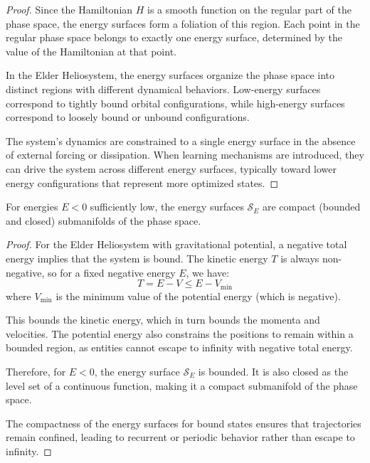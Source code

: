 \begin{proof}
Since the Hamiltonian $H$ is a smooth function on the regular part of the phase space, the energy surfaces form a foliation of this region. Each point in the regular phase space belongs to exactly one energy surface, determined by the value of the Hamiltonian at that point.

In the Elder Heliosystem, the energy surfaces organize the phase space into distinct regions with different dynamical behaviors. Low-energy surfaces correspond to tightly bound orbital configurations, while high-energy surfaces correspond to loosely bound or unbound configurations.

The system's dynamics are constrained to a single energy surface in the absence of external forcing or dissipation. When learning mechanisms are introduced, they can drive the system across different energy surfaces, typically toward lower energy configurations that represent more optimized states.
\end{proof}

\begin{theorem}
For energies $E < 0$ sufficiently low, the energy surfaces $\mathcal{S}_E$ are compact (bounded and closed) submanifolds of the phase space.
\end{theorem}

\begin{proof}
For the Elder Heliosystem with gravitational potential, a negative total energy implies that the system is bound. The kinetic energy $T$ is always non-negative, so for a fixed negative energy $E$, we have:
\begin{equation}
T = E - V \leq E - V_{\min}
\end{equation}
where $V_{\min}$ is the minimum value of the potential energy (which is negative).

This bounds the kinetic energy, which in turn bounds the momenta and velocities. The potential energy also constrains the positions to remain within a bounded region, as entities cannot escape to infinity with negative total energy.

Therefore, for $E < 0$, the energy surface $\mathcal{S}_E$ is bounded. It is also closed as the level set of a continuous function, making it a compact submanifold of the phase space.

The compactness of the energy surfaces for bound states ensures that trajectories remain confined, leading to recurrent or periodic behavior rather than escape to infinity.
\end{proof}

